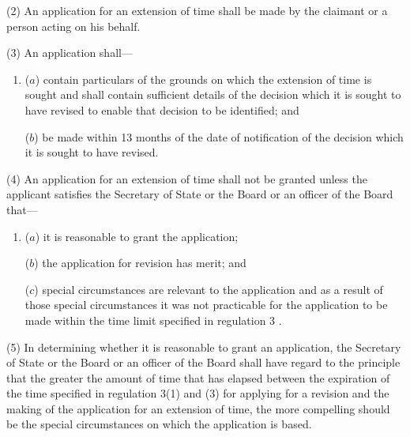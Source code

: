 \documentclass[12pt,a4paper]{article}
\begin{document}
\pagebreak[3]

(2) An application for an extension of time shall be made by 
%
the claimant or a person acting on his behalf.

(3) An application shall—
\begin{enumerate}\item[]
($a$) contain particulars of the grounds on which the extension of time is sought and shall contain sufficient details of the decision which it is sought to have revised to enable that decision to be identified; and

($b$) be made within 13 months of the date of notification of the decision which it is sought to have revised.
\end{enumerate}

(4) An application for an extension of time shall not be granted unless the applicant satisfies the Secretary of State 
or the Board or an officer of the Board  %
that—
\begin{enumerate}\item[]
($a$) it is reasonable to grant the application;

($b$) the application for revision has merit; and

($c$) special circumstances are relevant to the application and as a result of those special circumstances it was not practicable for the application to be made within the time limit specified in regulation 3%
%
.
\end{enumerate}

(5) In determining whether it is reasonable to grant an application, the Secretary of State 
or the Board or an officer of the Board  %
shall have regard to the principle that the greater the amount of time that has elapsed between the expiration of the time specified in regulation 3(1) and (3) 
%
for applying for a revision and the making of the application for an extension of time, the more compelling should be the special circumstances on which the application is based.
\end{document}
